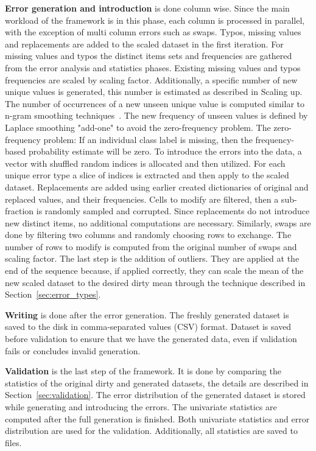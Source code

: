 \textbf{Error generation and introduction} is done column wise. 
Since the main workload of the framework is in this phase, each column is processed in parallel, with the exception of multi column errors such as swaps.
Typos, missing values and replacements are added to the scaled dataset in the first iteration.
For missing values and typos the distinct items sets and frequencies are gathered from the error analysis and statistics phases. 
Existing missing values and typos frequencies are scaled by scaling factor. Additionally, a specific number of new unique values is generated, this number is estimated as described in Scaling up.
The number of occurrences of a new unseen unique value is computed similar to n-gram smoothing techniques~\cite{ngrams}. 
The new frequency of unseen values is defined by Laplace smoothing "add-one" to avoid the zero-frequency problem.
The zero-frequency problem: If an individual class label is missing, then the frequency-based probability estimate will be zero.
To introduce the errors into the data, a vector with shuffled random indices is allocated and then utilized. 
For each unique error type a slice of indices is extracted and then apply to the scaled dataset.
Replacements are added using earlier created dictionaries of original and replaced values, and their frequencies.
Cells to modify are filtered, then a sub-fraction is randomly sampled and corrupted.
Since replacements do not introduce new distinct items, no additional computations are necessary. 
Similarly, swaps are done by filtering two columns and randomly choosing rows to exchange. 
The number of rows to modify is computed from the original number of swaps and scaling factor.
The last step is the addition of outliers. 
They are applied at the end of the sequence because, if applied correctly, they can scale the mean of the new scaled dataset to the desired dirty mean through the technique described in Section~\ref{sec:error_types}. 


\textbf{Writing} is done after the error generation. 
The freshly generated dataset is saved to the disk in comma-separated values (CSV) format. 
Dataset is saved before validation to ensure that we have the generated data, even if validation fails or concludes invalid generation.


\textbf{Validation} is the last step of the framework. It is done by comparing the statistics of the original dirty and generated datasets, the details are described in Section~\ref{sec:validation}.
The error distribution of the generated dataset is stored while generating and introducing the errors.
The univariate statistics are computed after the full generation is finished.
Both univariate statistics and error distribution are used for the validation. 
Additionally, all statistics are saved to files.

